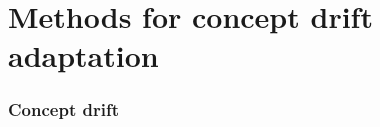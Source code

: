 \section{Methods for concept drift adaptation}

\begin{frame}
\frametitle{Concept drift}

\end{frame}
